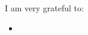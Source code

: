\begin{agradecimentos}
  I am very grateful to:
  \begin{itemize}
  \item


    

    
    
 
  \end{itemize}

\end{agradecimentos}
